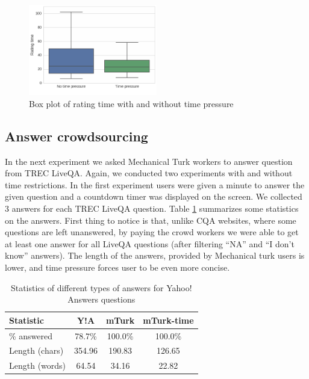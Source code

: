 \documentclass[11pt,letterpaper]{article}
\begin{document}
\begin{figure}[t!]
	\centering
	\includegraphics[width=0.5\textwidth]{img/validation_time}
	\caption{Box plot of rating time with and without time pressure}
	\label{figure:validation_time}
\end{figure}

\subsection{Answer crowdsourcing}

In the next experiment we asked Mechanical Turk workers to answer question from TREC LiveQA.
Again, we conducted two experiments with and without time restrictions.
In the first experiment users were given a minute to answer the given question and a countdown timer was displayed on the screen.
We collected 3 answers for each TREC LiveQA question.
Table \ref{table:answer_stats} summarizes some statistics on the answers.
First thing to notice is that, unlike CQA websites, where some questions are left unanswered, by paying the crowd workers we were able to get at least one answer for all LiveQA questions (after filtering ``NA'' and ``I don't know'' answers).
The length of the answers, provided by Mechanical turk users is lower, and time pressure forces user to be even more concise.


\begin{table}[h]
\centering
\caption{Statistics of different types of answers for Yahoo! Answers questions}
\begin{tabular}{| p{2.3cm} | c | c | c |}
\hline
Statistic & Y!A & mTurk & mTurk-time\\
\hline
\% answered & 78.7\% & 100.0\% & 100.0\% \\
Length (chars) & 354.96 & 190.83 & 126.65 \\
Length (words) & 64.54 & 34.16 & 22.82 \\
\hline
\end{tabular}
\label{table:answer_stats}
\end{table}
\end{document}
